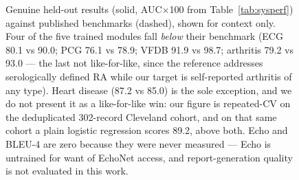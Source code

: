 \documentclass[AMA,STIX1COL,]{WileyNJD-v2}
\begin{document}
\begin{figure}[!t]
\centering
{}
\caption{Genuine held-out results (solid, AUC$\times$100 from
Table~\ref{tab:sysperf}) against published benchmarks (dashed), shown
for context only. Four of the five trained modules fall \emph{below}
their benchmark (ECG 80.1 vs 90.0; PCG 76.1 vs 78.9; VFDB 91.9 vs 98.7;
arthritis 79.2 vs 93.0 --- the last not like-for-like, since the
reference addresses serologically defined RA while our target is
self-reported arthritis of any type). Heart disease (87.2 vs 85.0) is the sole
exception, and we do not present it as a like-for-like win: our figure
is repeated-CV on the deduplicated 302-record Cleveland cohort, and on
that same cohort a plain logistic regression scores 89.2, above both.
Echo and BLEU-4 are zero because they were never measured --- Echo is
untrained for want of EchoNet access, and report-generation quality is
not evaluated in this work.}
\label{fig:barperf}
\end{figure}

\end{document}
